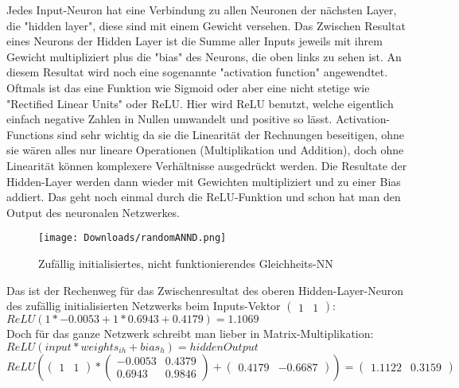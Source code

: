 \documentclass[11pt,a4paper,ngerman]{article}
\begin{document}
Jedes Input-Neuron hat eine Verbindung zu allen Neuronen der nächsten Layer, die "hidden layer", diese sind mit einem Gewicht versehen. Das Zwischen Resultat eines Neurons der Hidden Layer ist die Summe aller Inputs jeweils mit ihrem Gewicht multipliziert plus die "bias" des Neurons, die oben links zu sehen ist. An diesem Resultat wird noch eine sogenannte "activation function" angewendtet. Oftmals ist das eine Funktion wie Sigmoid oder aber eine nicht stetige wie "Rectified Linear Units" oder ReLU. Hier wird ReLU benutzt, welche eigentlich einfach negative Zahlen in Nullen umwandelt und positive so lässt. Activation-Functions sind sehr wichtig da sie die Linearität der Rechnungen beseitigen, ohne sie wären alles nur lineare Operationen (Multiplikation und Addition), doch ohne Linearität können komplexere Verhältnisse ausgedrückt werden. Die Resultate der Hidden-Layer werden dann wieder mit Gewichten multipliziert und zu einer Bias addiert. Das geht noch einmal durch die ReLU-Funktion und schon hat man den Output des neuronalen Netzwerkes.

\begin{figure}[h]
    \begin{center}
        \texttt{[image: Downloads/randomANND.png]}
    \caption{Zufällig initialisiertes, nicht funktionierendes Gleichheits-NN}
    \end{center}    
\end{figure}



Das ist der Rechenweg für das Zwischenresultat des oberen Hidden-Layer-Neuron des zufällig initialisierten Netzwerks beim Inputs-Vektor $\left(\begin{array}{cc} 1 & 1\end{array}\right) $:\\

$ ReLU(1 * -0.0053 + 1 * 0.6943 + 0.4179) = 1.1069 $\\

Doch für das ganze Netzwerk schreibt man lieber in Matrix-Multiplikation:\\

$ ReLU(input * weights_{ih} + bias_h) = hiddenOutput $\\

$ReLU(\left(\begin{array}{cc} 1 & 1\end{array}\right) * \left(\begin{array}{cc} -0.0053 & 0.4379\\ 0.6943 & 0.9846\end{array}\right) + \left(\begin{array}{cc} 0.4179 & -0.6687\end{array}\right)) = \left(\begin{array}{cc} 1.1122 & 0.3159\end{array}\right)$\\
\end{document}
